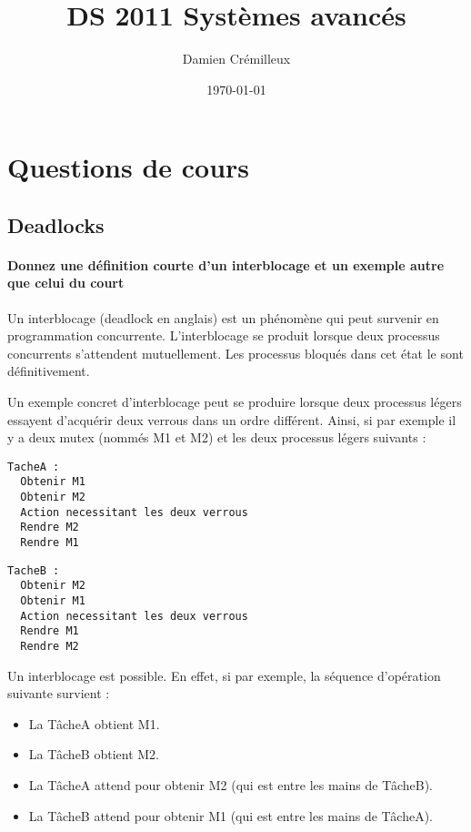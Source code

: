 \documentclass[a4paper]{article}
\begin{document}
\title{DS 2011 Systèmes avancés}
\author{Damien Crémilleux}
\date{\today}

\maketitle


\section{Questions de cours}

\subsection{Deadlocks}

\paragraph{Donnez une définition courte d'un interblocage et un exemple autre que celui du court}
Un interblocage (deadlock en anglais) est un phénomène qui peut survenir en programmation concurrente. L'interblocage se produit lorsque deux processus concurrents s'attendent mutuellement. Les processus bloqués dans cet état le sont définitivement.

Un exemple concret d'interblocage peut se produire lorsque deux processus légers essayent d'acquérir deux verrous dans un ordre différent. Ainsi, si par exemple il y a deux mutex (nommés M1 et M2) et les deux processus légers suivants :

\begin{lstlisting}
TacheA :
  Obtenir M1
  Obtenir M2
  Action necessitant les deux verrous
  Rendre M2
  Rendre M1
\end{lstlisting}

\begin{lstlisting}
TacheB :
  Obtenir M2
  Obtenir M1
  Action necessitant les deux verrous
  Rendre M1
  Rendre M2
\end{lstlisting}

Un interblocage est possible. En effet, si par exemple, la séquence d'opération suivante survient :
\begin{itemize}
\item La TâcheA obtient M1.
\item La TâcheB obtient M2.
\item La TâcheA attend pour obtenir M2 (qui est entre les mains de TâcheB).
\item La TâcheB attend pour obtenir M1 (qui est entre les mains de TâcheA).
\end{itemize}
\end{document}
